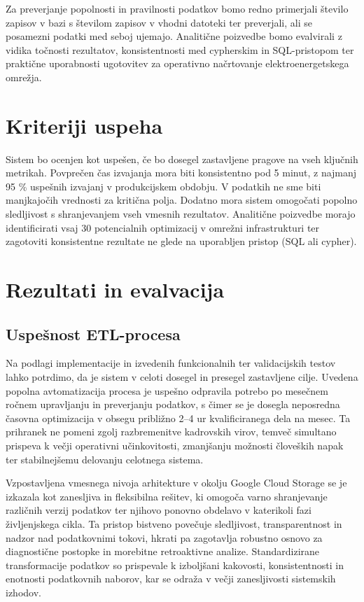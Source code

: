 \documentclass[a4paper,12pt,openright]{book}
\begin{document}
Za preverjanje popolnosti in pravilnosti podatkov bomo redno primerjali število zapisov v bazi s številom zapisov v vhodni datoteki ter preverjali, ali se posamezni podatki med seboj ujemajo.
Analitične poizvedbe bomo evalvirali z vidika točnosti rezultatov, konsistentnosti med cypherskim in SQL-pristopom ter praktične uporabnosti ugotovitev za operativno načrtovanje elektroenergetskega omrežja.

\section{Kriteriji uspeha}

Sistem bo ocenjen kot uspešen, če bo dosegel zastavljene pragove na vseh ključnih metrikah. Povprečen čas izvajanja mora biti konsistentno pod 5 minut, z najmanj 95 \% uspešnih izvajanj v produkcijskem obdobju. V podatkih ne sme biti manjkajočih vrednosti za kritična polja. Dodatno mora sistem omogočati popolno sledljivost s shranjevanjem vseh vmesnih rezultatov.
Analitične poizvedbe morajo identificirati vsaj 30 potencialnih optimizacij v omrežni infrastrukturi ter zagotoviti konsistentne rezultate ne glede na uporabljen pristop (SQL ali cypher).

\section{Rezultati in evalvacija}

\subsection{Uspešnost ETL-procesa}

Na podlagi implementacije in izvedenih funkcionalnih ter validacijskih testov lahko potrdimo, da je sistem v celoti dosegel in presegel zastavljene cilje. Uvedena popolna avtomatizacija procesa je uspešno odpravila potrebo po mesečnem ročnem upravljanju in preverjanju podatkov, s čimer se je dosegla neposredna časovna optimizacija v obsegu približno 2–4 ur kvalificiranega dela na mesec. Ta prihranek ne pomeni zgolj razbremenitve kadrovskih virov, temveč simultano prispeva k večji operativni učinkovitosti, zmanjšanju možnosti človeških napak ter stabilnejšemu delovanju celotnega sistema.

Vzpostavljena vmesnega nivoja arhitekture v okolju Google Cloud Storage se je izkazala kot zanesljiva in fleksibilna rešitev, ki omogoča varno shranjevanje različnih verzij podatkov ter njihovo ponovno obdelavo v katerikoli fazi življenjskega cikla. Ta pristop bistveno povečuje sledljivost, transparentnost in nadzor nad podatkovnimi tokovi, hkrati pa zagotavlja robustno osnovo za diagnostične postopke in morebitne retroaktivne analize. Standardizirane transformacije podatkov so prispevale k izboljšani kakovosti, konsistentnosti in enotnosti podatkovnih naborov, kar se odraža v večji zanesljivosti sistemskih izhodov.
\end{document}
